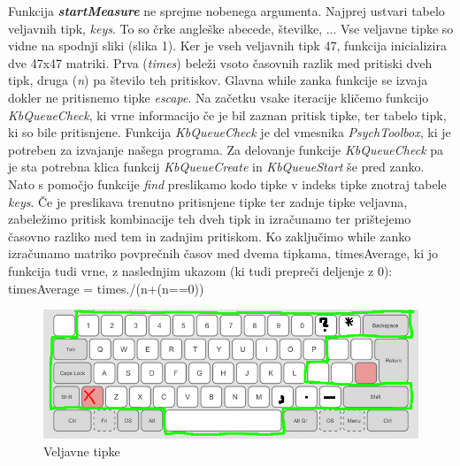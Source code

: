 \documentclass[12pt]{article}
\begin{document}
Funkcija \textbf{\textit{startMeasure}} ne sprejme nobenega argumenta.
Najprej ustvari tabelo veljavnih tipk, \textit{keys}.
To so črke angleške abecede, številke, ... Vse veljavne tipke so vidne na spodnji sliki (slika 1).
Ker je vseh veljavnih tipk 47, funkcija inicializira dve 47x47 matriki. 
Prva (\textit{times}) beleži vsoto časovnih razlik med pritiski dveh tipk, druga (\textit{n}) pa število teh pritiskov. 
Glavna while zanka funkcije se izvaja dokler ne pritisnemo tipke \textit{escape}. 
Na začetku vsake iteracije kličemo funkcijo \textit{KbQueueCheck}, ki vrne informacijo če je bil zaznan pritisk tipke, 
ter tabelo tipk, ki so bile pritisnjene. Funkcija \textit{KbQueueCheck} je del vmesnika \textit{PsychToolbox}, 
ki je potreben za izvajanje našega programa. Za delovanje funkcije \textit{KbQueueCheck} pa je sta potrebna klica 
funkcij \textit{KbQueueCreate} in \textit{KbQueueStart} še pred zanko. Nato s pomočjo funkcije \textit{find} 
preslikamo kodo tipke v indeks tipke znotraj tabele \textit{keys}. Če je preslikava trenutno pritisnjene tipke 
ter zadnje tipke veljavna, zabeležimo pritisk kombinacije teh dveh tipk in izračunamo ter prištejemo časovno 
razliko med tem in zadnjim pritiskom. Ko zaključimo while zanko izračunamo matriko povprečnih časov med dvema 
tipkama, timesAverage, ki jo funkcija tudi vrne, z naslednjim ukazom (ki tudi prepreči deljenje z 0): 
timesAverage = times./(n+(n==0))

\begin{figure}[h]
  \centering
  \label{slika1}
  \includegraphics[scale=1.5]{keyboard}
  \caption{Veljavne tipke}
\end{figure}
\end{document}
